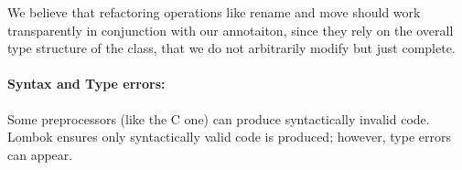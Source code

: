 We believe that refactoring operations like rename and move
should work transparently in conjunction with our annotaiton, since they rely on 
the overall type structure of the class, that we do not arbitrarily modify but just complete.






\paragraph{Syntax and Type errors:}
Some preprocessors (like the C one) can produce syntactically invalid code.
Lombok ensures only syntactically valid code is produced; however, type errors can appear.

